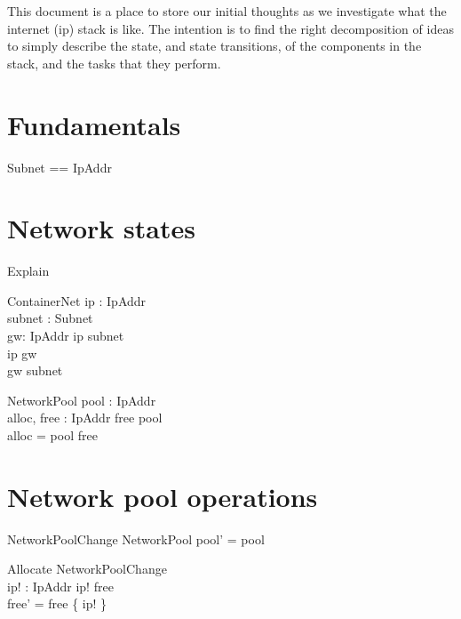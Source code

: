 \documentclass[a4paper,twoside,12pt]{article}
\begin{document}
This document is a place to store our initial thoughts as we investigate what the internet (ip) stack is like. The intention is to find the right decomposition of ideas to simply describe the state, and state transitions, of the components in the stack, and the tasks that they perform.

\section{Fundamentals}

\begin{zed}
\also
Subnet == \power IpAddr
\end{zed}

\section{Network states}

Explain

\begin{schema}{ContainerNet}
ip : IpAddr \\
subnet : Subnet \\
gw: IpAddr
\where
ip \in subnet \\
ip \neq gw \\
gw \notin subnet
\end{schema}

\begin{schema}{NetworkPool}
pool : \power IpAddr \\
alloc, free : \power IpAddr
\where
free \subseteq pool \\
alloc = pool \setminus free
\end{schema}

\section{Network pool operations}

\begin{schema}{NetworkPoolChange}
\Delta NetworkPool
\where
pool' = pool
\end{schema}

\begin{schema}{Allocate}
NetworkPoolChange \\
ip! : IpAddr
\where
ip! \in free \\
free' = free \setminus \{ ip! \}
\end{schema}
\end{document}
